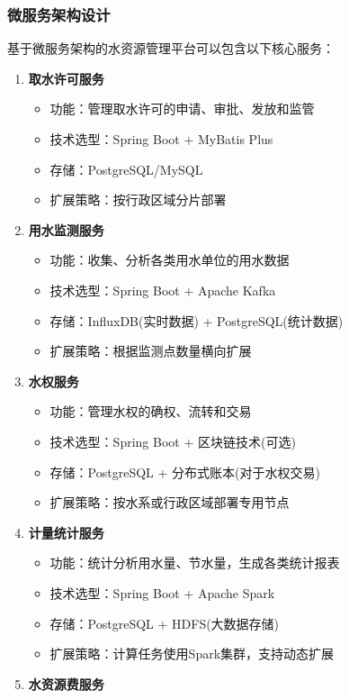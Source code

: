 \subsubsection{微服务架构设计}\label{ux5faeux670dux52a1ux67b6ux6784ux8bbeux8ba1-2}

基于微服务架构的水资源管理平台可以包含以下核心服务：

\begin{enumerate}
\def\labelenumi{\arabic{enumi}.}
\tightlist
\item
  \textbf{取水许可服务}

  \begin{itemize}
  \tightlist
  \item
    功能：管理取水许可的申请、审批、发放和监管
  \item
    技术选型：Spring Boot + MyBatis Plus
  \item
    存储：PostgreSQL/MySQL
  \item
    扩展策略：按行政区域分片部署
  \end{itemize}
\item
  \textbf{用水监测服务}

  \begin{itemize}
  \tightlist
  \item
    功能：收集、分析各类用水单位的用水数据
  \item
    技术选型：Spring Boot + Apache Kafka
  \item
    存储：InfluxDB(实时数据) + PostgreSQL(统计数据)
  \item
    扩展策略：根据监测点数量横向扩展
  \end{itemize}
\item
  \textbf{水权服务}

  \begin{itemize}
  \tightlist
  \item
    功能：管理水权的确权、流转和交易
  \item
    技术选型：Spring Boot + 区块链技术(可选)
  \item
    存储：PostgreSQL + 分布式账本(对于水权交易)
  \item
    扩展策略：按水系或行政区域部署专用节点
  \end{itemize}
\item
  \textbf{计量统计服务}

  \begin{itemize}
  \tightlist
  \item
    功能：统计分析用水量、节水量，生成各类统计报表
  \item
    技术选型：Spring Boot + Apache Spark
  \item
    存储：PostgreSQL + HDFS(大数据存储)
  \item
    扩展策略：计算任务使用Spark集群，支持动态扩展
  \end{itemize}
\item
  \textbf{水资源费服务}


\end{enumerate}

